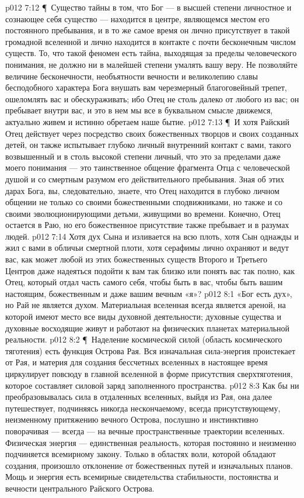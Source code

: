 \vs p012 7:12 \P\ Существо тайны в том, что Бог --- в высшей степени личностное и сознающее себя существо --- находится в центре, являющемся местом его постоянного пребывания, и в то же самое время он лично присутствует в такой громадной вселенной и лично находится в контакте с почти бесконечным числом существ. То, что такой феномен есть тайна, выходящая за пределы человеческого понимания, не должно ни в малейшей степени умалять вашу веру. Не позволяйте величине бесконечности, необъятности вечности и великолепию славы бесподобного характера Бога внушать вам черезмерный благоговейный трепет, ошеломлять вас и обескураживать; ибо Отец не столь далеко от любого из вас; он пребывает внутри вас, и это в нем мы все в буквальном смысле движемся, актуально живем и истинно обретаем наше бытие.
\vs p012 7:13 \P\ И хотя Райский Отец действует через посредство своих божественных творцов и своих созданных детей, он также испытывает глубоко личный внутренний контакт с вами, такого возвышенный и в столь высокой степени личный, что это за пределами даже моего понимания --- это таинственное общение фрагмента Отца с человеческой душой и со смертным разумом его действительного пребывания. Зная об этих дарах Бога, вы, следовательно, знаете, что Отец находится в глубоко личном общении не только со своими божественными сподвижниками, но также и со своими эволюционирующими детьми, живущими во времени. Конечно, Отец остается в Раю, но его божественное присутствие также пребывает и в разумах людей.
\vs p012 7:14 Хотя дух Сына и изливается на всю плоть, хотя Сын однажды и жил с вами в обличьи смертной плоти, хотя серафимы лично охраняют и ведут вас, как может любой из этих божественных существ Второго и Третьего Центров даже надеяться подойти к вам так близко или понять вас так полно, как Отец, который отдал часть самого себя, чтобы быть в вас, чтобы быть вашим настоящим, божественным и даже вашим вечным «я»?
\vs p012 8:1 «Бог есть дух», но Рай не является духом. Материальная вселенная всегда является ареной, на которой имеют место все виды духовной деятельности; духовные существа и духовные восходящие живут и работают на физических планетах материальной реальности.
\vs p012 8:2 \P\ Наделение космической силой (область космического тяготения) есть функция Острова Рая. Вся изначальная сила\hyp{}энергия проистекает от Рая, и материя для создания бессчетных вселенных в настоящее время циркулирует повсюду в главной вселенной в форме присутствия сверхтяготения, которое составляет силовой заряд заполненного пространства.
\vs p012 8:3 Как бы ни преобразовывалась сила в отдаленных вселенных, выйдя из Рая, она далее путешествует, подчиняясь никогда нескончаемому, всегда присутствующему, неизменному притяжению вечного Острова, послушно и инстинктивно поворачивая --- всегда --- на вечные пространственные траектории вселенных. Физическая энергия --- единственная реальность, которая постоянно и неизменно подчиняется всемирному закону. Только в областях воли, которой обладают создания, произошло отклонение от божественных путей и изначальных планов. Мощь и энергия есть всемирные свидетельства стабильности, постоянства и вечности центрального Райского Острова.
